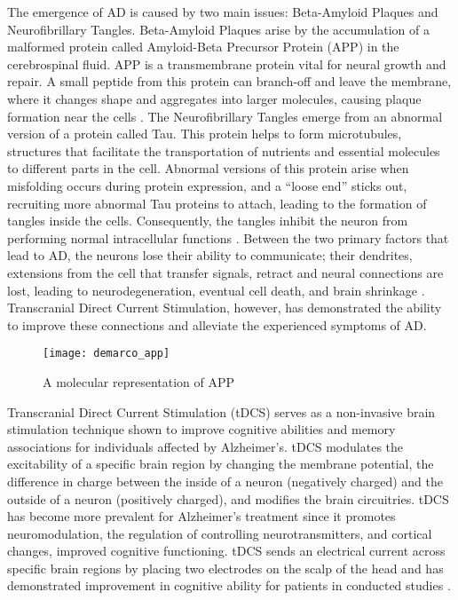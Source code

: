 The emergence of AD is caused by two main issues: Beta-Amyloid Plaques and Neurofibrillary Tangles. Beta-Amyloid Plaques arise by the accumulation of a malformed protein called Amyloid-Beta Precursor Protein (APP) in the cerebrospinal fluid. APP is a transmembrane protein vital for neural growth and repair. A small peptide from this protein can branch-off and leave the membrane, where it changes shape and aggregates into larger molecules, causing plaque formation near the cells \cite{Goodsell}. The Neurofibrillary Tangles emerge from an abnormal version of a protein called Tau. This protein helps to form microtubules, structures that facilitate the transportation of nutrients and essential molecules to different parts in the cell. Abnormal versions of this protein arise when misfolding occurs during protein expression, and a “loose end” sticks out, recruiting more abnormal Tau proteins to attach, leading to the formation of tangles inside the cells. Consequently, the tangles inhibit the neuron from performing normal intracellular functions \cite{Foundation}. Between the two primary factors that lead to AD, the neurons lose their ability to communicate; their dendrites, extensions from the cell that transfer signals, retract and neural connections are lost, leading to neurodegeneration, eventual cell death, and brain shrinkage \cite{Health}. Transcranial Direct Current Stimulation, however, has demonstrated the ability to improve these connections and alleviate the experienced symptoms of AD.

\renewcommand{\thefigure}{1}
\begin{wrapfigure}{R}{0.5\textwidth}
  \begin{center}
    \texttt{[image: demarco\_app]}
  \end{center}
  \caption{A molecular representation of APP}
\end{wrapfigure}

Transcranial Direct Current Stimulation (tDCS) serves as a non-invasive brain stimulation technique shown to improve cognitive abilities and memory associations for individuals affected by Alzheimer’s. tDCS modulates the excitability of a specific brain region by changing the membrane potential, the difference in charge between the inside of a neuron (negatively charged) and the outside of a neuron (positively charged), and modifies the brain circuitries. tDCS has become more prevalent for Alzheimer’s treatment since it promotes neuromodulation, the regulation of controlling neurotransmitters, and cortical changes, improved cognitive functioning. tDCS sends an electrical current across specific brain regions by placing two electrodes on the scalp of the head and has demonstrated improvement in cognitive ability for patients in conducted studies \cite{Machado}.

